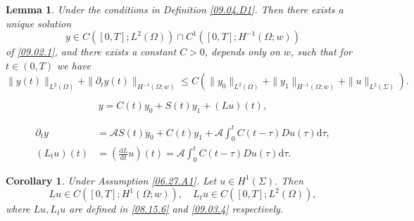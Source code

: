 \documentclass[10pt,a4paper]{amsart}
\newtheorem{lemma}{Lemma}
\newtheorem{corollary}{Corollary}
\def\Om{\Omega}
\def\df{\mathrm d}
\def\f{\frac}
\def\mcA{\mathcal{A}}
\def\pt{\partial}
\begin{document}
\begin{lemma}\label{09.04.L1}
	Under the conditions in Definition \ref{09.04.D1}. Then there exists a unique solution 
	\begin{equation*}
		y\in C([0,T]; L^2(\Om))\cap C^1([0,T]; H^{-1}(\Om;w))
	\end{equation*}
	of \eqref{09.02.1}, and there exists a constant $C>0$, depends only on $w$, such that for $t\in (0,T)$ we have 
	\begin{equation*}
		\|y(t)\|_{L^2(\Om)}+\|\pt_t y(t)\|_{H^{-1}(\Om;w)}\leq C\left(\|y_0\|_{L^2(\Om)}+\|y_1\|_{H^{-1}(\Om;w)}+\|u\|_{L^2(\Sigma)}\right). 
	\end{equation*} 
\end{lemma}

	\begin{equation}\label{08.15.6}
		y=C(t)y_0+S(t)y_1+(Lu)(t), 
	\end{equation}

	\begin{equation}\label{09.03.4}
		\begin{split} 
			\pt_ty 
			&=\mcA S(t) y_0+C(t) y_1+\mcA \int_0^t C(t-\tau)Du(\tau)\df \tau,\\
			(L_tu)(t)
			&=\left(\f{\df L}{\df t}u\right)(t)=\mcA\int_0^t C(t-\tau)Du(\tau)\df\tau. 
		\end{split} 
	\end{equation}

\begin{corollary}\label{09.03.C1}
	Under Assumption \ref{06.27.A1}. Let $u\in H^{1}(\Sigma)$. Then  
	\begin{equation*}
		Lu\in C([0,T]; H^1(\Om;w)),\quad L_tu\in C([0,T]; L^2(\Om)), 
	\end{equation*}
	where $Lu, L_tu$ are defined in \eqref{08.15.6} and \eqref{09.03.4} respectively. 
\end{corollary}
\end{document}
